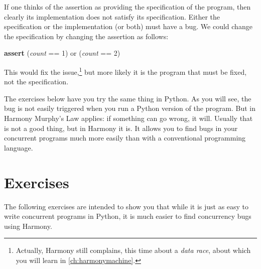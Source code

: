 \documentclass{report}
\newenvironment{code}{
\tcolorbox
}{
\endtcolorbox
}
\begin{document}
%

If one thinks of the assertion as providing the specification of the
program, then clearly its implementation does not satisfy its specification.
Either the specification or the implementation (or both) must have a bug.
We could change the specification by changing the assertion as follows:

\begin{code}
\textbf{assert} (\textit{count} == 1) or (\textit{count} == 2)
\end{code}

This would fix the issue,\footnote{Actually, Harmony still complains, this time
about a \emph{data race}, about which you will learn in \autoref{ch:harmonymachine}.}
but more likely it is the program that must be fixed, not the specification.

The exercises below have you try the same thing in Python.  As you will
see, the bug is not easily triggered when you run a Python version of
the program.  But in Harmony Murphy's Law applies:
if something can go wrong, it will.  Usually that is not a good thing,
but in Harmony it is.  It allows you to find bugs in your concurrent
programs much more easily than with a conventional programming language.

\section*{Exercises}

The following exercises are intended to show you that while it is just
as easy to write concurrent programs in Python, it is much easier to
find concurrency bugs using Harmony.
\end{document}
